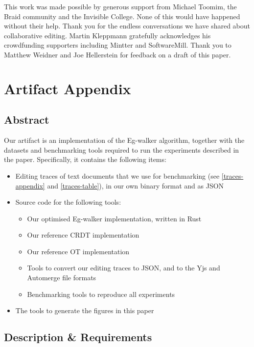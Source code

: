 \documentclass[sigplan,10pt]{acmart}
\begin{document}
\begin{acks}
  This work was made possible by generous support from Michael Toomim, the Braid community and the Invisible College. None of this would have happened without their help. Thank you for the endless conversations we have shared about collaborative editing.
  Martin Kleppmann gratefully acknowledges his crowdfunding supporters including Mintter and SoftwareMill.
  Thank you to Matthew Weidner and Joe Hellerstein for feedback on a draft of this paper.
\end{acks}




\newpage
\appendix
\section{Artifact Appendix} 
\subsection{Abstract}

Our artifact is an implementation of the Eg-walker algorithm, together with the datasets and benchmarking tools required to run the experiments described in the paper.
Specifically, it contains the following items:
\begin{itemize}
    \item Editing traces of text documents that we use for benchmarking (see \autoref{traces-appendix} and \autoref{traces-table}), in our own binary format and as JSON
    \item Source code for the following tools:
        \begin{itemize}
            \item Our optimised Eg-walker implementation, written in Rust
            \item Our reference CRDT implementation
            \item Our reference OT implementation
            \item Tools to convert our editing traces to JSON, and to the Yjs and Automerge file formats
            \item Benchmarking tools to reproduce all experiments
        \end{itemize}
    \item The tools to generate the figures in this paper
\end{itemize}

\subsection{Description \& Requirements}
\end{document}
